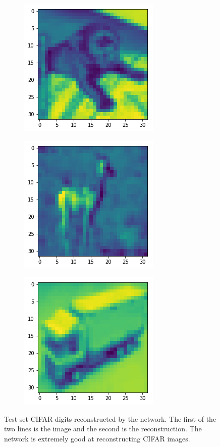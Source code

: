 \begin{figure}[H]
\bigskip
\begin{subfigure}{.3\linewidth}
    \centering
    \includegraphics[scale=0.4]{chapter_3_figures/cifar_chimp_test.png}
\end{subfigure}
    \hfill
\begin{subfigure}{.3\linewidth}
    \centering
    \includegraphics[scale=0.4]{chapter_3_figures/cifar_gazelle_test.png}
\end{subfigure}
   \hfill
\begin{subfigure}{.3\linewidth}
    \centering
    \includegraphics[scale=0.4]{chapter_3_figures/cifar_lorry_test.png}
\end{subfigure}
\caption{Test set CIFAR digits reconstructed by the network. The first of the two lines is the image and the second is the reconstruction. The network is extremely good at reconstructing CIFAR images.}
\end{figure}

